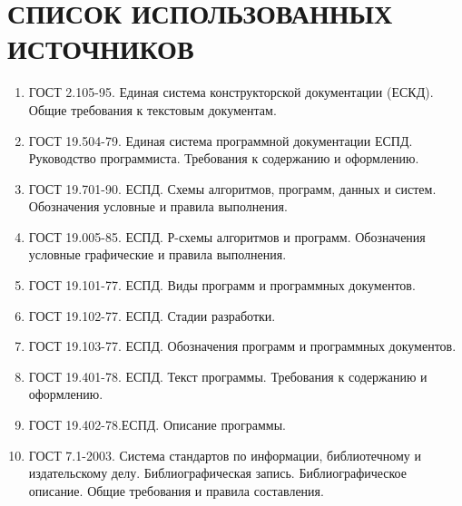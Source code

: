 \newpage

\section*{СПИСОК ИСПОЛЬЗОВАННЫХ ИСТОЧНИКОВ}

\begin{enumerate}
    \item ГОСТ 2.105-95. Единая система конструкторской документации (ЕСКД). Общие требования к текстовым документам. 
    \item ГОСТ 19.504-79. Единая система программной документации ЕСПД. Руководство программиста. Требования к содержанию и оформлению.
    \item ГОСТ 19.701-90. ЕСПД. Схемы алгоритмов, программ, данных и систем. Обозначения условные и правила выполнения.
    \item ГОСТ 19.005-85. ЕСПД. 
    Р-схемы алгоритмов и программ. Обозначения условные графические и правила выполнения.
    \item ГОСТ 19.101-77. ЕСПД. Виды программ и программных документов.
    \item ГОСТ 19.102-77. ЕСПД. Стадии разработки.
    \item ГОСТ 19.103-77. ЕСПД.  Обозначения программ и программных документов.
    \item ГОСТ 19.401-78. ЕСПД. Текст программы. Требования к содержанию и оформлению.
    \item ГОСТ 19.402-78.ЕСПД. Описание программы.
    \item ГОСТ 7.1-2003. Система стандартов по информации, библиотечному и издательскому делу. Библиографическая запись. Библиографическое описание. Общие требования и правила составления. 
\end{enumerate}
